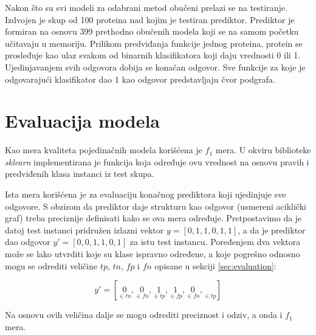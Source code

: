 Nakon što su svi modeli za odabrani metod obučeni prelazi se na testiranje. Izdvojen je skup od 100 proteina nad kojim je testiran prediktor. Prediktor je formiran na osnovu 399 prethodno obučenih modela koji se na samom početku učitavaju u memoriju. Prilikom predviđanja funkcije jednog proteina, protein se prosleđuje kao ulaz svakom od binarnih klasifikatora koji daju vrednosti 0 ili 1. Ujedinjavanjem svih odgovora dobija se konačan odgovor. Sve funkcije za koje je odgovarajući klasifikator dao 1 kao odgovor predstavljaju čvor podgrafa.



\section{Evaluacija modela}

Kao mera kvaliteta pojedinačnih modela korišćena je $f_1$ mera. U okviru biblioteke \textit{sklearn} implementirana je funkcija koja određuje ovu vrednost na osnovu pravih i predviđenih klasa instanci iz test skupa. 

Ista mera korišćena je za evaluaciju konačnog prediktora koji ujedinjuje sve odgovore. S obzirom da prediktor daje strukturu kao odgovor (usmereni aciklički graf) treba preciznije definisati kako se ova mera određuje. Pretpostavimo da je datoj test instanci pridružen izlazni vektor $y = [0, 1, 1, 0, 1, 1]$, a da je prediktor dao odgovor $y' = [0, 0, 1, 1, 0, 1]$ za istu test instancu. Poređenjem dva vektora može se lako utvrditi koje su klase ispravno određene, a koje pogrešno odnosno mogu se odrediti veličine $tp$, $tn$, $fp$ i $fn$ opisane u sekciji \ref{sec:evaluation}:

$$y' = [\underset{\in tn}{0}, \underset{\in fn}{0}, \underset{\in tp}{1}, \underset{\in fp}{1}, \underset{\in fn}{0}, \underset{\in tp}{}]$$

\noindent Na osnovu ovih veličina dalje se mogu odrediti preciznost i odziv, a onda i  $f_1$ mera.




